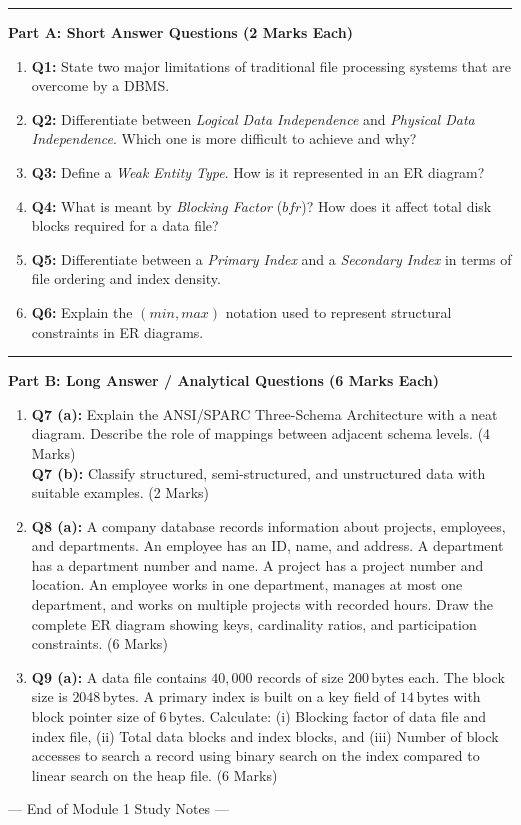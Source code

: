 \documentclass[11pt,a4paper]{article}
\newcommand{\concept}[1]{%
  \vspace{3pt}\noindent\textcolor{AnthGreen}{\rule{3.5pt}{10pt}}\enspace
  \textbf{\sffamily\color{AnthDark}#1}\par\vspace{2pt}%
}
\begin{document}
\concept{Part A: Short Answer Questions (2 Marks Each)}
\begin{enumerate}
  \item \textbf{Q1:} State two major limitations of traditional file processing systems that are overcome by a DBMS.
  \item \textbf{Q2:} Differentiate between \emph{Logical Data Independence} and \emph{Physical Data Independence}. Which one is more difficult to achieve and why?
  \item \textbf{Q3:} Define a \emph{Weak Entity Type}. How is it represented in an ER diagram?
  \item \textbf{Q4:} What is meant by \emph{Blocking Factor} ($bfr$)? How does it affect total disk blocks required for a data file?
  \item \textbf{Q5:} Differentiate between a \emph{Primary Index} and a \emph{Secondary Index} in terms of file ordering and index density.
  \item \textbf{Q6:} Explain the $(min, max)$ notation used to represent structural constraints in ER diagrams.
\end{enumerate}

\concept{Part B: Long Answer / Analytical Questions (6 Marks Each)}
\begin{enumerate}
  \item \textbf{Q7 (a):} Explain the ANSI/SPARC Three-Schema Architecture with a neat diagram. Describe the role of mappings between adjacent schema levels. \hfill (4 Marks) \\
  \textbf{Q7 (b):} Classify structured, semi-structured, and unstructured data with suitable examples. \hfill (2 Marks)
  
  \item \textbf{Q8 (a):} A company database records information about projects, employees, and departments. An employee has an ID, name, and address. A department has a department number and name. A project has a project number and location. An employee works in one department, manages at most one department, and works on multiple projects with recorded hours. Draw the complete ER diagram showing keys, cardinality ratios, and participation constraints. \hfill (6 Marks)

  \item \textbf{Q9 (a):} A data file contains $40,000$ records of size $200\,\text{bytes}$ each. The block size is $2048\,\text{bytes}$. A primary index is built on a key field of $14\,\text{bytes}$ with block pointer size of $6\,\text{bytes}$. Calculate: (i) Blocking factor of data file and index file, (ii) Total data blocks and index blocks, and (iii) Number of block accesses to search a record using binary search on the index compared to linear search on the heap file. \hfill (6 Marks)
\end{enumerate}

\vfill
\begin{center}
\small\sffamily\color{AnthMidGray}
--- End of Module 1 Study Notes ---
\end{center}
\end{document}
